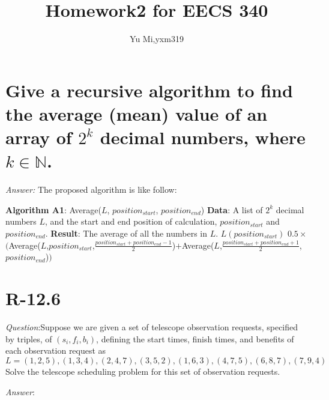 \documentclass[11pt]{article}
\begin{document}
	\title{Homework2 for EECS 340}
	\author{Yu Mi,yxm319}
	\maketitle
\section{Give a recursive algorithm to find the average (mean) value of an array of $2^k$ decimal numbers, where $k\in \mathbb{N}$.}
	\emph{Answer:} The proposed algorithm is like follow:
	
	\begin{algorithmic}
	\State \textbf{Algorithm A1}: Average($L$, $position_{start}$, $position_{end}$)
	\State \textbf{Data}: A list of $2^k$ decimal numbers $L$, and the start and end position of calculation, $position_{start}$ and $position_{end}$.
	\State \textbf{Result}: The average of all the numbers in $L$.
		\State \Return $L(position_{start})$
	\Else
		\State \Return $0.5\times$ $($Average($L$,$position_{start}$,$\frac{position_{start}+position_{end}-1}{2}$)$+$Average($L$,$\frac{position_{start}+position_{end}+1}{2}$,$position_{end}$)$)$
	\EndIf
	\end{algorithmic}
\section{R-12.6}
	\emph{Question}:Suppose we are given a set of telescope observation requests, specified by triples, of $(s_i, f_i, b_i)$, defining the start times, finish times, and benefits of each observation request as
	\begin{equation*}
		L={(1,2,5),(1,3,4),(2,4,7), (3,5,2), (1,6,3), (4,7,5), (6,8,7), (7,9,4)}
	\end{equation*}
	Solve the telescope scheduling problem for this set of observation requests.

\noindent	\emph{Answer}:
	
\end{document}

